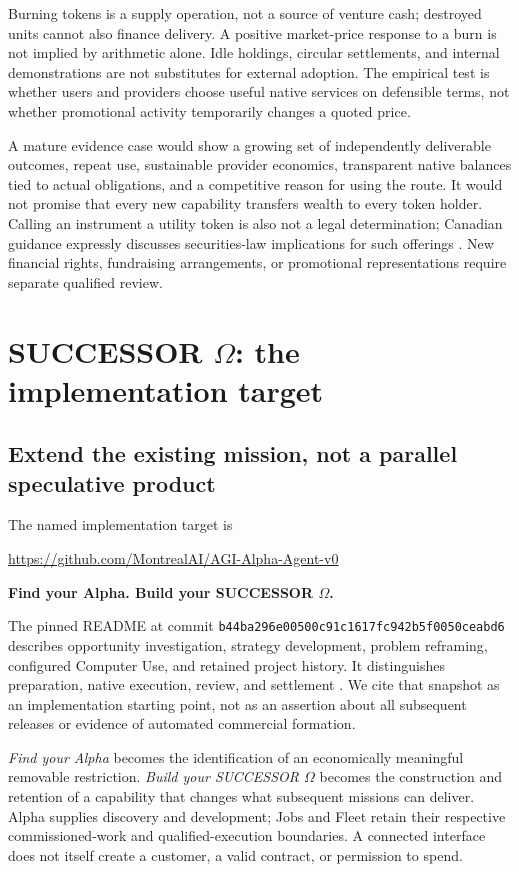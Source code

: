 \documentclass[11pt,letterpaper]{article}
\theoremstyle{remark}\newtheorem{remark}{Remark}[section]
\begin{document}
Burning tokens is a supply operation, not a source of venture cash; destroyed units cannot also finance delivery. A positive market-price response to a burn is not implied by arithmetic alone. Idle holdings, circular settlements, and internal demonstrations are not substitutes for external adoption. The empirical test is whether users and providers choose useful native services on defensible terms, not whether promotional activity temporarily changes a quoted price.

A mature evidence case would show a growing set of independently deliverable outcomes, repeat use, sustainable provider economics, transparent native balances tied to actual obligations, and a competitive reason for using the route. It would not promise that every new capability transfers wealth to every token holder. Calling an instrument a utility token is also not a legal determination; Canadian guidance expressly discusses securities-law implications for such offerings \citep{csa2018}. New financial rights, fundraising arrangements, or promotional representations require separate qualified review.

\section{SUCCESSOR \texorpdfstring{$\Omega$}{Omega}: the implementation target}
\label{sec:implementation}
\subsection{Extend the existing mission, not a parallel speculative product}
The named implementation target is
\begin{center}
\url{https://github.com/MontrealAI/AGI-Alpha-Agent-v0}\par\smallskip
\textbf{Find your Alpha. Build your SUCCESSOR $\Omega$.}
\end{center}
The pinned README at commit \texttt{b44ba296e00500c91c1617fc942b5f0050ceabd6} describes opportunity investigation, strategy development, problem reframing, configured Computer Use, and retained project history. It distinguishes preparation, native execution, review, and settlement \citep{alphaRepo}. We cite that snapshot as an implementation starting point, not as an assertion about all subsequent releases or evidence of automated commercial formation.

\emph{Find your Alpha} becomes the identification of an economically meaningful removable restriction. \emph{Build your SUCCESSOR $\Omega$} becomes the construction and retention of a capability that changes what subsequent missions can deliver. Alpha supplies discovery and development; Jobs and Fleet retain their respective commissioned-work and qualified-execution boundaries. A connected interface does not itself create a customer, a valid contract, or permission to spend.
\end{document}
